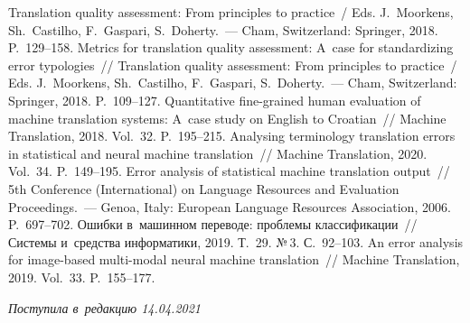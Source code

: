 \begin{multicols}{2}
{{\begin{thebibliography}{99}
Translation quality assessment: From principles to practice~/ Eds. J.~Moorkens, Sh.~Castilho, 
F.~Gaspari, S.~Doherty.~--- Cham, Switzerland: Springer, 2018. P.~129--158.
 Metrics for translation quality assessment: A~case for standardizing error 
typologies~// Translation quality assessment: From principles to practice~/ Eds. J.~Moorkens, 
Sh.~Castilho, F.~Gaspari, S.~Doherty.~--- Cham, Switzerland: Springer, 2018. P.~109--127.
 Quantitative fine-grained human 
evaluation of machine translation systems: A~case study on English to Croatian~// Machine 
Translation, 2018. Vol.~32. P.~195--215.
 Analysing terminology translation errors in 
statistical and neural machine translation~// Machine Translation, 2020. Vol.~34. P.~149--195.
 Error analysis of statistical machine translation output~// 
5th Conference (International) on Language Resources and Evaluation Proceedings.~--- Genoa, 
Italy: European Language Resources Association, 2006. P.~697--702.
 Ошибки в~машинном переводе: 
проблемы классификации~// Системы и~средства информатики, 2019. Т.~29. №\,3. С.~92--103.
 An error analysis for image-based multi-modal neural machine 
translation~// Machine Translation, 2019. Vol.~33. P.~155--177.
  \end{thebibliography}

}
}

\end{multicols}

\vspace*{-7pt}

\hfill{\small\textit{Поступила в~редакцию 14.04.2021}}



\newpage

\vspace*{-28pt}




